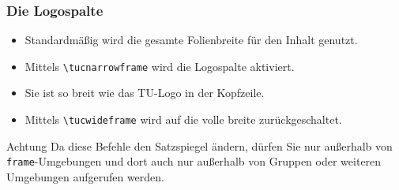 \begin{frame}[containsverbatim]
\frametitle{Die Logospalte}

\begin{itemize}
\item Standardmäßig wird die gesamte Folienbreite für den Inhalt genutzt.
\item Mittels \lstinline+\tucnarrowframe+ wird die Logospalte aktiviert.
\item Sie ist so breit wie das TU-Logo in der Kopfzeile.
\item Mittels \lstinline+\tucwideframe+ wird auf die volle breite zurückgeschaltet.
\end{itemize}

\medskip

\begin{alertblock}{Achtung}
\centering
Da diese Befehle den Satzspiegel ändern, dürfen Sie nur außerhalb von
\texttt{frame}-Umgebungen und dort auch nur außerhalb von Gruppen oder weiteren
Umgebungen aufgerufen werden.
\end{alertblock}
\end{frame}

\tucnarrowframe

